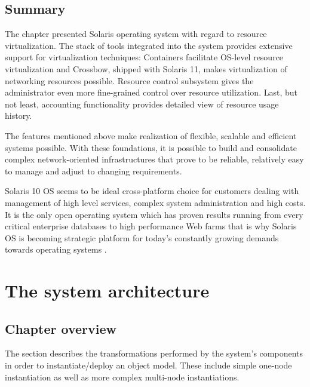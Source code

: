 \documentclass[11pt]{book}
\begin{document}
                

    \section*{Summary}

      The chapter presented Solaris operating system with regard to resource virtualization. The stack of tools
      integrated into the system provides extensive support for virtualization techniques: Containers facilitate
      OS-level resource virtualization and Crossbow, shipped with Solaris 11, makes virtualization of networking
      resources possible. Resource control subsystem gives the administrator even more fine-grained control over
      resource utilization. Last, but not least, accounting functionality provides detailed view of resource usage
      history.

      The features mentioned above make realization of flexible, scalable and efficient systems possible. With these
      foundations, it is possible to build and consolidate complex network-oriented infrastructures that prove to be
      reliable, relatively easy to manage and adjust to changing requirements.

      Solaris 10 OS seems to be ideal cross-platform choice for customers dealing with management of high level
      services, complex system administration and high costs. It is the only open operating system which has proven
      results running from every critical enterprise databases to high performance Web farms that is why Solaris OS is
      becoming strategic platform for today's constantly growing demands towards operating systems \cite{solaris_operating_system}. 


  \chapter{The system architecture}

    \section*{Chapter overview}

      The  section describes the transformations performed by the system's components in order
      to instantiate/deploy an object model. These include simple one-node instantiation as well as more complex
      multi-node instantiations.
\end{document}
